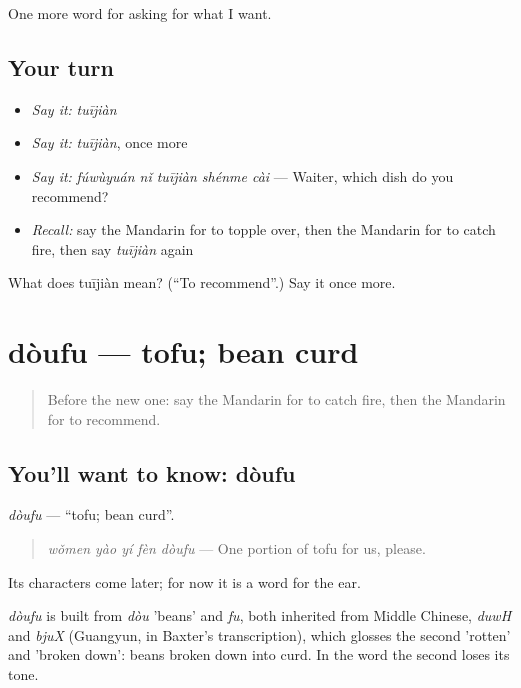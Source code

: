 \begin{grammarlens}[title={What you've built}]
One more word for asking for what I want.
\end{grammarlens}

\subsection*{Your turn}
\begin{itemize}
\raggedright
  \item \emph{Say it:} \emph{tuījiàn}
  \item \emph{Say it:} \emph{tuījiàn}, once more
  \item \emph{Say it:} \emph{fúwùyuán nǐ tuījiàn shénme cài} — Waiter, which dish do you recommend?
  \item \emph{Recall:} say the Mandarin for to topple over, then the Mandarin for to catch fire, then say \emph{tuījiàn} again
\end{itemize}

\begin{tcolorbox}[breakable,colback=teal!4,colframe=teal!35!black,title={Before you move on}]
What does tuījiàn mean? (\textquotedblleft{}To recommend\textquotedblright{}.) Say it once more.
\end{tcolorbox}
\section[dòufu]{dòufu — tofu; bean curd}

\label{lesson:ZH-C177-doufu}



\begin{quote}
Before the new one: say the Mandarin for to catch fire, then the Mandarin for to recommend.
\end{quote}

\subsection*{You'll want to know: dòufu}
\emph{dòufu} — \textquotedblleft{}tofu; bean curd\textquotedblright{}.

\begin{quote}
\emph{wǒmen yào yí fèn dòufu} — One portion of tofu for us, please.
\end{quote}

Its characters come later; for now it is a word for the ear.

\begin{cousinweb}
\emph{dòufu} is built from \emph{dòu} 'beans' and \emph{fu}, both inherited from Middle Chinese, \emph{duwH} and \emph{bjuX} (Guangyun, in Baxter's transcription), which glosses the second 'rotten' and 'broken down': beans broken down into curd. In the word the second loses its tone.
\end{cousinweb}

